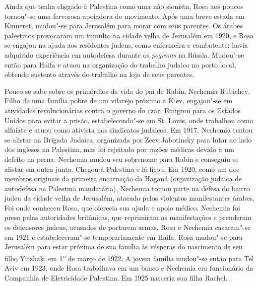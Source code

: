 Ainda que tenha chegado à Palestina como uma não sionista, Rosa aos
poucos tornou"-se uma fervorosa apoiadora do movimento. Após uma breve
estada em Kinneret, mudou"-se para Jerusalém para morar com seus
parentes. Os árabes palestinos provocaram um tumulto na cidade velha de
Jerusalém em 1920, e Rosa se engajou na ajuda aos residentes judeus, como
enfermeira e combatente; havia adquirido experiência em autodefesa
durante os \emph{pogroms} na Rússia. Mudou"-se então para Haifa e atuou
na organização do trabalho judaico no porto local, obtendo sustento
através do trabalho na loja de seus parentes.

Pouco se sabe sobre os primórdios da vida do pai de Rabin, Nechemia
Rubichev. Filho de uma família pobre de um vilarejo próximo a Kiev,
engajou"-se em atividades revolucionárias contra o governo do czar.
Emigrou para os Estados Unidos para evitar a prisão, estabelecendo"-se em
St. Louis, onde trabalhou como alfaiate e atuou como ativista nos
sindicatos judaicos. Em 1917, Nechemia tentou se alistar na Brigada
Judaica, organizada por Zeev Jabotinsky para lutar ao lado dos
ingleses na Palestina, mas foi rejeitado por razões médicas devido a um
defeito na perna. Nechemia mudou seu sobrenome para Rabin e conseguiu
se alistar em outra junta. Chegou à Palestina e lá ficou. Em 1920, como
um dos membros originais da primeira encarnação da Haganá (organização
judaica de autodefesa na Palestina mandatária), Nechemia tomou parte na
defesa do bairro judeu da cidade velha de Jerusalém, atacado pelos
violentos manifestantes árabes. Foi onde conheceu Rosa, que
oferecia sua ajuda e apoio médico. Nechemia foi preso pelas autoridades
britânicas, que reprimiram as manifestações e prenderam os defensores
judeus, acusados de portarem armas. Rosa e Nechemia casaram"-se em 1921 e
estabeleceram"-se temporariamente em Haifa. Rosa mudou"-se para Jerusalém
para estar próxima de sua família às vésperas do nascimento de seu filho
Yitzhak, em 1\textsuperscript{o} de março de 1922. A jovem família
mudou"-se então para Tel Aviv em 1923, onde Rosa trabalhava em um banco e
Nechemia era funcionário da Companhia de Eletricidade Palestina. Em 1925 nasceria
sua filha Rachel.

